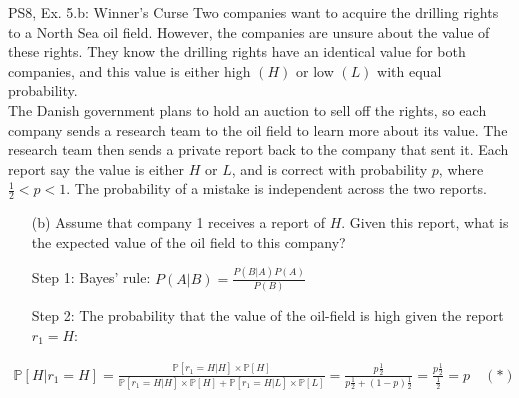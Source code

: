 \begin{frame}{PS8, Ex. 5.b: Winner's Curse}
      Two companies want to acquire the drilling rights to a North Sea oil field. However, the companies are unsure about the value of these rights. They know the drilling rights have an identical value for both companies, and this value is either high $(H)$ or low $(L)$ with equal probability.\\\smallskip
      The Danish government plans to hold an auction to sell off the rights, so each company sends a research team to the oil field to learn more about its value. The research team then sends a private report back to the company that sent it. Each report say the value is either $H$ or $L$, and is correct with probability $p$, where $\frac{1}{2} < p < 1$. The probability of a mistake is independent across the two reports.
      \begin{itemize}
        \item[(b)] Assume that company 1 receives a report of $H$. Given this report, what is the expected value of the oil field to this company?
        \item[Step 1:] Bayes' rule: $P(A|B)=\frac{P(B|A)P(A)}{P(B)}$
        \item[Step 2:] The probability that the value of the oil-field is high given the report $r_1=H$:
      \end{itemize}
      \vspace{-12pt}
      \begin{align*}
        \mathbb{P}[H|r_1=H]=\frac{\mathbb{P}[r_1=H|H]\times\mathbb{P}[H]}{\mathbb{P}[r_1=H|H]\times\mathbb{P}[H]+\mathbb{P}[r_1=H|L]\times\mathbb{P}[L]}=\frac{p\frac{1}{2}}{p\frac{1}{2}+(1-p)\frac{1}{2}}=\frac{p\frac{1}{2}}{\frac{1}{2}}=p\quad (*)
      \end{align*}
      \vfill\null
\end{frame}
